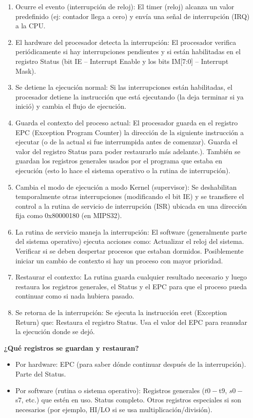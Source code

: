 \documentclass{article}
\begin{document}
\begin{enumerate}
\item Ocurre el evento (interrupción de reloj): El timer (reloj) alcanza un valor predefinido (ej: contador llega a cero) y envía una señal de interrupción (IRQ) a la CPU.
\item El hardware del procesador detecta la interrupción: El procesador verifica periódicamente si hay interrupciones pendientes y si están habilitadas en el registro Status (bit IE – Interrupt Enable y los bits IM[7:0] – Interrupt Mask).
\item Se detiene la ejecución normal: Si las interrupciones están habilitadas, el procesador detiene la instrucción que está ejecutando (la deja terminar si ya inició) y cambia el flujo de ejecución.
\item Guarda el contexto del proceso actual: El procesador guarda en el registro EPC (Exception Program Counter) la dirección de la siguiente instrucción a ejecutar (o de la actual si fue interrumpida antes de comenzar). Guarda el valor del registro Status para poder restaurarlo más adelante.). También se guardan los registros generales usados por el programa que estaba en ejecución (esto lo hace el sistema operativo o la rutina de interrupción).
\item Cambia el modo de ejecución a modo Kernel (supervisor): Se deshabilitan temporalmente otras interrupciones (modificando el bit IE) y se transfiere el control a la rutina de servicio de interrupción (ISR) ubicada en una dirección fija como 0x80000180 (en MIPS32).
\item La rutina de servicio maneja la interrupción: El software (generalmente parte del sistema operativo) ejecuta acciones como: Actualizar el reloj del sistema. Verificar si se deben despertar procesos que estaban dormidos. Posiblemente iniciar un cambio de contexto si hay un proceso con mayor prioridad.
\item Restaurar el contexto: La rutina guarda cualquier resultado necesario y luego restaura los registros generales, el Status y el EPC para que el proceso pueda continuar como si nada hubiera pasado.
\item Se retorna de la interrupción: Se ejecuta la instrucción eret (Exception Return) que: Restaura el registro Status. Usa el valor del EPC para reanudar la ejecución donde se dejó.
\end{enumerate}

\textbf{¿Qué registros se guardan y restauran?}

\begin{itemize}
    \item Por hardware: EPC (para saber dónde continuar después de la interrupción). Parte del Status.
    \item Por software (rutina o sistema operativo): Registros generales ($t0-$t9, $s0-$s7, etc.) que estén en uso. Status completo. Otros registros especiales si son necesarios (por ejemplo, HI/LO si se usa multiplicación/división).
\end{itemize}
\end{document}
